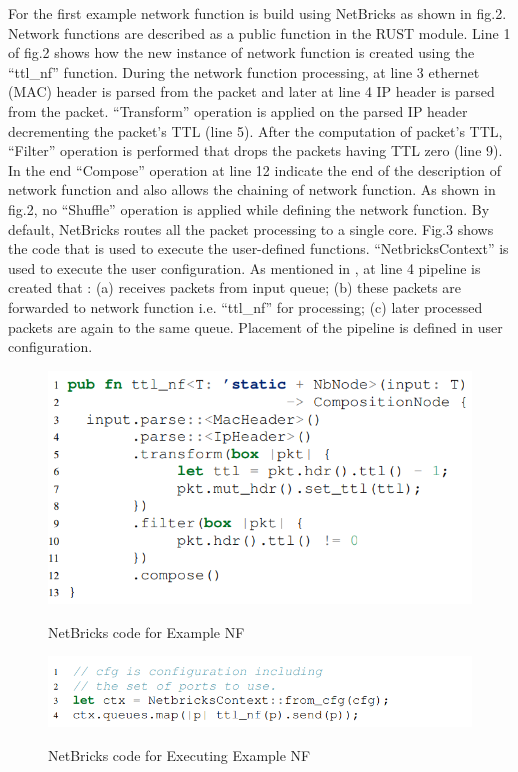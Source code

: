 \documentclass[10pt, a4paper, conference]{IEEEtran}
\begin{document}
For the first example network function is build using NetBricks as shown in fig.2. Network functions are described as a public function in the RUST module. Line 1 of fig.2 shows how the new instance of network function is created using the “ttl\_nf” function. During the network function processing, at line 3 ethernet (MAC) header is parsed from the packet and later at line 4 IP header is parsed from the packet. “Transform” operation is applied on the parsed IP header decrementing the packet’s TTL (line 5). After the computation of packet’s TTL, “Filter” operation is performed that drops the packets having TTL zero (line 9). In the end “Compose” operation at line 12 indicate the end of the description of network function and also allows the chaining of network function. As shown in fig.2, no “Shuffle” operation is applied while defining the network function. By default, NetBricks routes all the packet processing to a single core. Fig.3 shows the code that is used to execute the user-defined functions. “NetbricksContext” is used to execute the user configuration. As mentioned in \cite{Panda2016}, at line 4 pipeline is created that : (a) receives packets from input queue; (b) these packets are forwarded to network function i.e. “ttl\_nf” for processing; (c) later processed packets are again to the same queue. Placement of the pipeline is defined in user configuration.
\begin{figure}
	\centering
	\includegraphics[width=\linewidth]{figures/fig2}
	\caption{NetBricks code for Example NF}
	\cite{Panda2016}
	\label{key2}
\end{figure}
\begin{figure}
	\centering
	\includegraphics[width=\linewidth]{figures/fig3}
	\caption{NetBricks code for Executing Example NF}
	\cite{Panda2016}
	\label{key3}
\end{figure}
\end{document}
